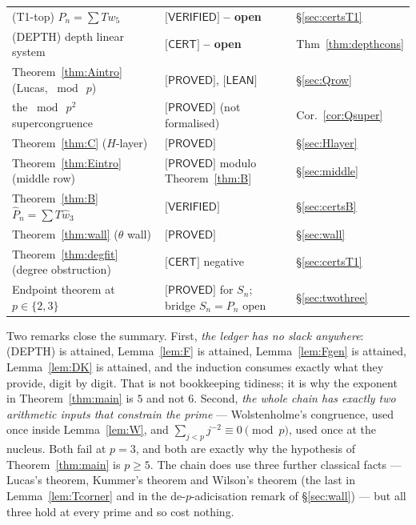 \documentclass[11pt,reqno]{amsart}
\theoremstyle{plain}
\theoremstyle{definition}
\theoremstyle{remark}
\numberwithin{equation}{section}
\newcommand{\wfive}{w_5}
\newcommand{\wthree}{\hat w_3}
\newcommand{\PROVED}{\textsf{[PROVED]}}
\newcommand{\VERIFIED}{\textsf{[VERIFIED]}}
\newcommand{\CERT}{\textsf{[CERT]}}
\newcommand{\LEAN}{\textsf{[LEAN]}}
\begin{document}
\begin{center}
\begin{tabular}{@{}lll@{}}
(T1-top) $P_n=\sum T\wfive$ & $\VERIFIED$ \textbf{-- open} & \S\ref{sec:certsT1}\\
(DEPTH) depth linear system & $\CERT$ \textbf{-- open} & Thm~\ref{thm:depthcons}\\
\midrule
Theorem~\ref{thm:Aintro} (Lucas, $\bmod\ p$) & $\PROVED$, $\LEAN$ & \S\ref{sec:Qrow}\\
\quad the $\bmod\ p^2$ supercongruence & $\PROVED$ (not formalised) & Cor.~\ref{cor:Qsuper}\\
Theorem~\ref{thm:C} ($H$-layer) & $\PROVED$ & \S\ref{sec:Hlayer}\\
Theorem~\ref{thm:Eintro} (middle row) & $\PROVED$ modulo Theorem~\ref{thm:B} & \S\ref{sec:middle}\\
Theorem~\ref{thm:B} $\hat P_n=\sum T\wthree$ & $\VERIFIED$ & \S\ref{sec:certsB}\\
Theorem~\ref{thm:wall} ($\theta$ wall) & $\PROVED$ & \S\ref{sec:wall}\\
Theorem~\ref{thm:degfit} (degree obstruction) & $\CERT$ negative & \S\ref{sec:certsT1}\\
Endpoint theorem at $p\in\{2,3\}$ & $\PROVED$ for $S_n$; bridge $S_n=P_n$ open & \S\ref{sec:twothree}\\
\bottomrule
\end{tabular}
\end{center}

\medskip
\noindent
Two remarks close the summary. First, \emph{the ledger has no slack anywhere}: (DEPTH) is
attained, Lemma~\ref{lem:F} is attained, Lemma~\ref{lem:Fgen} is attained,
Lemma~\ref{lem:DK} is attained, and the induction consumes exactly what they provide, digit by
digit. That is not bookkeeping tidiness; it is why the exponent in Theorem~\ref{thm:main} is
$5$ and not $6$.
Second, \emph{the whole chain has exactly two arithmetic inputs that constrain the prime} ---
Wolstenholme's congruence, used once inside Lemma~\ref{lem:W}, and
$\sum_{j<p}j^{-2}\equiv0\pmod p$, used once at the nucleus. Both fail at $p=3$, and both are
exactly why the hypothesis of Theorem~\ref{thm:main} is $p\ge5$. The chain does use three
further classical facts --- Lucas's theorem, Kummer's theorem and Wilson's theorem (the last in
Lemma~\ref{lem:Tcorner} and in the de-$p$-adicisation remark of \S\ref{sec:wall}) --- but all
three hold at every prime and so cost nothing.
\end{document}

